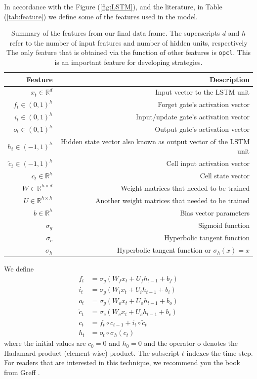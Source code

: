 \documentclass[twoside]{report}
\newcommand{\code}{\texttt}
\begin{document}
\begin{spacing}{1}
In accordance with the Figure (\ref{fig:LSTM}), and the literature, in Table (\ref{tab:feature}) we define some of the features used in the model.
\begin{table}[!htbp]
    \centering
    \begin{tabular}{rr}
    \hline 
    \textbf{Feature} & \textbf{Description} \\
    \hline
    $ x_{t} \in \mathbb{R}^{d}$ & Input vector to the LSTM unit\\
    $f_{t} \in(0,1)^{h}$ & Forget gate's activation vector\\
    $i_{t} \in(0,1)^{h}$ & Input/update gate's activation vector\\
    $o_{t} \in(0,1)^{h}$ & Output gate's activation vector\\
    $h_{t} \in(-1,1)^{h}$ & Hidden state vector also known as output vector of the LSTM unit\\
    $\tilde{c}_{t} \in(-1,1)^{h}$ & Cell input activation vector\\ 
    $c_{t} \in \mathbb{R}^{h}$ & Cell state vector\\
    $W \in \mathbb{R}^{h \times d}$ & Weight matrices that needed to be trained\\
    $U \in \mathbb{R}^{h \times h}$ & Another weight matrices that needed to be trained \\
    $b \in \mathbb{R}^{h}$ & Bias vector parameters \\
    $\sigma_{g}$ & Sigmoid function \\
    $\sigma_{c}$ & Hyperbolic tangent function \\
    $\sigma_{h}$ & Hyperbolic tangent function or  $\sigma_{h}(x)=x$\\
    \hline 
    \end{tabular} \vspace{-0.2mm}
    \caption{Summary of the features from our final data frame. The superscripts $d$ and $h$ refer to the number of input features and number of hidden units, respectively The only feature that is obtained via the function of other features is \code{opcl}. This is an important feature for developing strategies.}
    \label{tab:my_label}
\end{table}

We define 
\[
\begin{aligned}
f_{t} &=\sigma_{g}\left(W_{f} x_{t}+U_{f} h_{t-1}+b_{f}\right) \\
i_{t} &=\sigma_{g}\left(W_{i} x_{t}+U_{i} h_{t-1}+b_{i}\right) \\
o_{t} &=\sigma_{g}\left(W_{o} x_{t}+U_{o} h_{t-1}+b_{o}\right) \\
\tilde{c}_{t} &=\sigma_{c}\left(W_{c} x_{t}+U_{c} h_{t-1}+b_{c}\right) \\
c_{t} &=f_{t} \circ c_{t-1}+i_{t} \circ \tilde{c}_{t} \\
h_{t} &=o_{t} \circ \sigma_{h}\left(c_{t}\right)
\end{aligned}
\]
where the initial values are $c_{0}=0$ and $h_{0}=0$ and the operator o denotes the Hadamard product (element-wise) product. The subscript $t$ indexes the time step. For readers that are interested in this technique, we recommend you the book from Greff \cite{greff2016lstm}.


\end{spacing}
\end{document}
